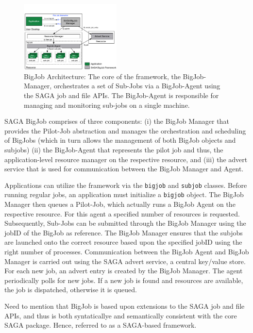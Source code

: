 \documentclass[conference,final]{IEEEtran}
\begin{document}
\begin{figure}[htbp]
    \centering
    \includegraphics[width=0.45\textwidth]{figures/bigjob}
   \caption{BigJob Architecture: The core of the framework, the
      BigJob-Manager, orchestrates a set of Sub-Jobs via a
      BigJob-Agent using the SAGA job and file APIs.  The
      BigJob-Agent is responsible for managing and monitoring sub-jobs
      on a single machine.}
   \label{fig:figures_bigjob}
\end{figure}

SAGA BigJob comprises of three components: (i) the BigJob Manager that
provides the Pilot-Job abstraction and manages the orchestration and
scheduling of BigJobs (which in turn allows the management of both
BigJob objects and subjobs) (ii) the BigJob-Agent that represents the
pilot job and thus, the application-level resource manager on the
respective resource, and (iii) the advert service that is used for
communication between the BigJob Manager and Agent.

Applications can utilize the framework via the \texttt{bigjob} and
\texttt{subjob} classes.  Before running regular jobs, an application
must initialize a \texttt{bigjob} object.  The BigJob Manager then
queues a Pilot-Job, which actually runs a BigJob Agent on the
respective resource. For this agent a specified number of resources is
requested. Subsequently, Sub-Jobs can be submitted through the BigJob
Manager using the jobID of the BigJob as reference. The BigJob
Manager ensures that the subjobs are launched onto the correct
resource based upon the specified jobID using the right number of
processes. Communication between the BigJob Agent and BigJob Manager
is carried out using the SAGA advert service, a central key/value
store. For each new job, an advert entry is created by the BigJob
Manager. The agent periodically polls for new jobs. If a new job is
found and resources are available, the job is dispatched, otherwise it
is queued.

Need to mention that BigJob is based upon extensions to the SAGA job
and file APIs, and thus is both syntaticallye and semantically
consistent with the core SAGA package. Hence, referred to as a
SAGA-based framework.
\end{document}
